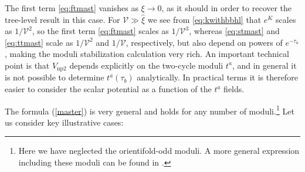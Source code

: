 \documentclass[12pt,a4wide]{article}
\def\xih{{\hat \xi}}
\def\V{\mathcal{V}}
\begin{document}
The first term \eqref{eq:ftmast} vanishes as $\xi \to 0$, as it should in order to recover the tree-level result in this case. 
For $\V\gg \xih$ we see from \eqref{eq:kwithbbhl} that $e^{K}$ scales as $1/\V^2$, so the first term \eqref{eq:ftmast} scales as $1/\V^3$, whereas \eqref{eq:stmast} and \eqref{eq:ttmast} scale as $1/\V^2$ and $1/\V$, respectively, 
but also depend on powers of $e^{-\tau_a}$, making the moduli stabilization calculation very rich. 
An important technical point is that $V_{\text{np2}}$
depends explicitly on the two-cycle moduli $t^a$, and in general it is not possible to determine $t^a(\tau_b)$ analytically. In practical terms it is therefore easier to consider the scalar potential as a function of the $t^a$ fields.

The formula (\ref{master}) is very general and holds for any number of moduli.\footnote{Here we have neglected the orientifold-odd moduli. A more general expression including these moduli can be found in \cite{Cicoli:2021tzt}.} 
Let us consider key illustrative cases: 
\end{document}
